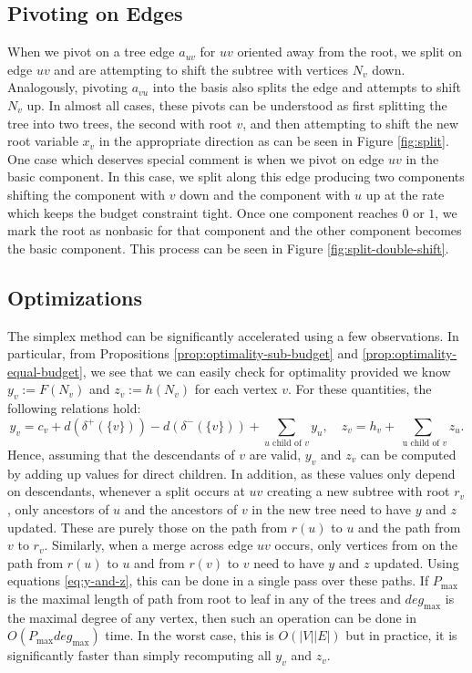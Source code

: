 \documentclass[titlepage,11pt]{article}
\begin{document}
\subsection{Pivoting on Edges}
When we pivot on a tree edge $a_{uv}$ for $uv$ oriented away from the root, we split on edge $uv$ and are attempting to shift the subtree with vertices $N_v$ down. Analogously, pivoting $a_{vu}$ into the basis also splits the edge and attempts to shift $N_v$ up. In almost all cases, these pivots can be understood as first splitting the tree into two trees, the second with root $v$, and then attempting to shift the new root variable $x_v$ in the appropriate direction as can be seen in Figure \ref{fig:split}. One case which deserves special comment is when we pivot on edge $uv$ in the basic component. In this case, we split along this edge producing two components shifting the component with $v$ down and the component with $u$ up at the rate which keeps the budget constraint tight. Once one component reaches $0$ or $1$, we mark the root as nonbasic for that component and the other component becomes the basic component. This process can be seen in Figure \ref{fig:split-double-shift}.

\subsection{Optimizations}
The simplex method can be significantly accelerated using a few observations. In particular, from Propositions \ref{prop:optimality-sub-budget} and \ref{prop:optimality-equal-budget}, we see that we can easily check for optimality provided we know $y_v := F(N_v)$ and $z_v := h(N_v)$ for each vertex $v$. For these quantities, the following relations hold:
\begin{equation}\label{eq:y-and-z}
    y_v = c_v + d(\delta^+(\{v\})) - d(\delta^-(\{v\})) + \sum_{u \text{ child  of }v}y_u, \quad z_v = h_v + \sum_{\text{ u child of }v}z_u.
\end{equation}
Hence, assuming that the descendants of $v$ are valid, $y_v$ and $z_v$ can be computed by adding up values for direct children. In addition, as these values only depend on descendants, whenever a split occurs at $uv$ creating a new subtree with root $r_v$, only ancestors of $u$ and the ancestors of $v$ in the new tree need to have $y$ and $z$ updated. These are purely those on the path from $r(u)$ to $u$ and the path from $v$ to $r_v$. Similarly, when a merge across edge $uv$ occurs, only vertices from on the path from $r(u)$ to $u$ and from $r(v)$ to $v$ need to have $y$ and $z$ updated. Using equations \eqref{eq:y-and-z}, this can be done in a single pass over these paths.
If $P_{\max}$ is the maximal length of path from root to leaf in any of the trees and $deg_{\max}$ is the maximal degree of any vertex, then such an operation can be done in $O(P_{\max} deg_{\max})$ time. In the worst case, this is $O(|V||E|)$ but in practice, it is significantly faster than simply recomputing all $y_v$ and $z_v$.
\end{document}
